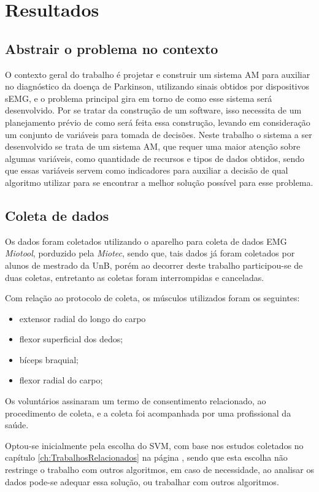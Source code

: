 \chapter{Resultados}
\label{ch:Resultados}
\section{Abstrair o problema no contexto}
O contexto geral do trabalho é projetar e construir um sistema AM para auxiliar no diagnóstico da doença de Parkinson, utilizando sinais obtidos por dispositivos sEMG, e o problema principal gira em torno de como esse sistema será desenvolvido. Por se tratar da construção de um software, isso necessita de um planejamento prévio de como será feita essa construção, levando em consideração um conjunto de variáveis para tomada de decisões. Neste trabalho o sistema a ser desenvolvido se trata de um sistema AM, que requer uma maior atenção sobre algumas variáveis, como quantidade de recursos e tipos de dados obtidos, sendo que essas variáveis servem como indicadores para auxiliar a decisão de qual algoritmo utilizar para se encontrar a melhor solução possível para esse problema.

\section{Coleta de dados}
Os dados foram coletados utilizando o aparelho para coleta de dados EMG \textit{Miotool}, porduzido pela \textit{Miotec}, sendo que, tais dados já foram coletados por alunos de mestrado da UnB, porém ao decorrer deste trabalho participou-se de duas coletas, entretanto as coletas foram interrompidas e canceladas.

Com relação ao protocolo de coleta, os músculos utilizados foram os seguintes:
\begin{itemize}
\item extensor radial do longo do carpo
\item flexor superficial dos dedos;
\item bíceps braquial;
\item flexor radial do carpo;
\end{itemize}

Os voluntários assinaram um termo de consentimento relacionado, ao procedimento de coleta, e a coleta foi acompanhada por uma profissional da saúde.
 
Optou-se inicialmente pela escolha do SVM, com base nos estudos coletados no capítulo \ref{ch:TrabalhosRelacionados} na página \pageref{ch:TrabalhosRelacionados}, sendo que esta escolha não restringe o trabalho com outros algoritmos, em caso de necessidade, ao analisar os dados pode-se adequar essa solução, ou trabalhar com outros algoritmos.